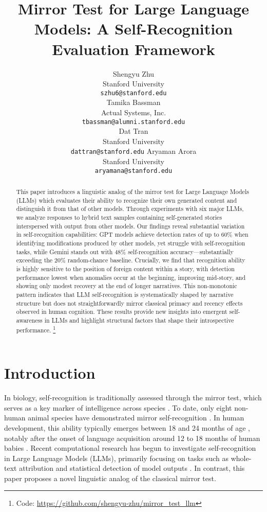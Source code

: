 \documentclass{article}
\title{Mirror Test for Large Language Models: A Self-Recognition Evaluation Framework}
\author{%
  Shengyu Zhu \\
  Stanford University\\
  \texttt{szhu6@stanford.edu} \\
  \And
  Tamika Bassman \\
  Actual Systems, Inc.\\
  \texttt{tbassman@alumni.stanford.edu} \\
  \And
  Dat Tran \\
  Stanford University\\
  \texttt{dattran@stanford.edu}
  \And
  Aryaman Arora \\
  Stanford University\\
  \texttt{aryamana@stanford.edu}
}
\begin{document}
\maketitle


\begingroup
\renewcommand\thefootnote{}
\endgroup


\begin{abstract}
This paper introduces a linguistic analog of the mirror test for Large Language Models (LLMs) which evaluates their ability to recognize their own generated content and distinguish it from that of other models. Through experiments with six major LLMs, we analyze responses to hybrid text samples containing self-generated stories interspersed with output from other models. Our findings reveal substantial variation in self-recognition capabilities: GPT models achieve detection rates of up to 60\% when identifying modifications produced by other models, yet struggle with self-recognition tasks, while Gemini stands out with 48\% self-recognition accuracy—substantially exceeding the 20\% random-chance baseline. Crucially, we find that recognition ability is highly sensitive to the position of foreign content within a story, with detection performance lowest when anomalies occur at the beginning, improving mid-story, and showing only modest recovery at the end of longer narratives. This non-monotonic pattern indicates that LLM self-recognition is systematically shaped by narrative structure but does not straightforwardly mirror classical primacy and recency effects observed in human cognition. These results provide new insights into emergent self-awareness in LLMs and highlight structural factors that shape their introspective performance. \footnote{Code: \url{https://github.com/shengyu-zhu/mirror_test_llm}}
\end{abstract}




\section{Introduction}

In biology, self-recognition is traditionally assessed through the mirror test, which serves as a key marker of intelligence across species \citep{bekoff2023smart}. To date, only eight non-human animal species have demonstrated mirror self-recognition \citep{bekoff2023smart}. In human development, this ability typically emerges between 18 and 24 months of age \citep{rochat2023developmental}, notably after the onset of language acquisition around 12 to 18 months of human babies \citep{childrens2024babiestalking}. Recent computational research has begun to investigate self-recognition in Large Language Models (LLMs), primarily focusing on tasks such as whole-text attribution and statistical detection of model outputs \citep{panickssery2024llm, jawahar2020automatic}. In contrast, this paper proposes a novel linguistic analog of the classical mirror test. 
\end{document}
